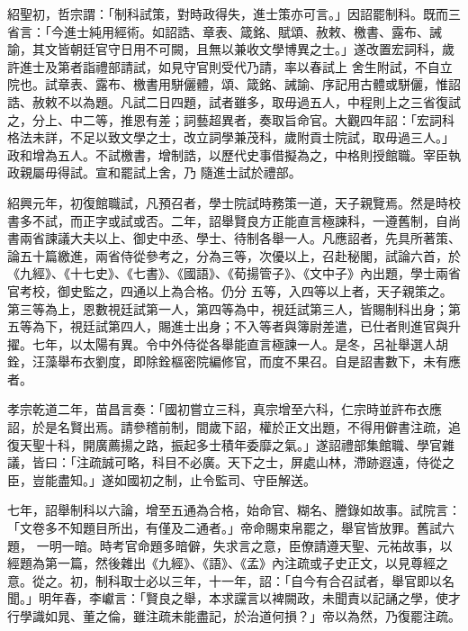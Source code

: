 \begin{pinyinscope}
 紹聖初，哲宗謂：「制科試策，對時政得失，進士策亦可言。」因詔罷制科。既而三省言：「今進士純用經術。如詔誥、章表、箴銘、賦頌、赦敕、檄書、露布、誡諭，其文皆朝廷官守日用不可闕，且無以兼收文學博異之士。」遂改置宏詞科，歲許進士及第者詣禮部請試，如見守官則受代乃請，率以春試上
 舍生附試，不自立院也。試章表、露布、檄書用駢儷體，頌、箴銘、誡諭、序記用古體或駢儷，惟詔誥、赦敕不以為題。凡試二日四題，試者雖多，取毋過五人，中程則上之三省復試之，分上、中二等，推恩有差；詞藝超異者，奏取旨命官。大觀四年詔：「宏詞科格法未詳，不足以致文學之士，改立詞學兼茂科，歲附貢士院試，取毋過三人。」政和增為五人。不試檄書，增制誥，以歷代史事借擬為之，中格則授館職。宰臣執政親屬毋得試。宣和罷試上舍，乃
 隨進士試於禮部。



 紹興元年，初復館職試，凡預召者，學士院試時務策一道，天子親覽焉。然是時校書多不試，而正字或試或否。二年，詔舉賢良方正能直言極諫科，一遵舊制，自尚書兩省諫議大夫以上、御史中丞、學士、待制各舉一人。凡應詔者，先具所著策、論五十篇繳進，兩省侍從參考之，分為三等，次優以上，召赴秘閣，試論六首，於《九經》、《十七史》、《七書》、《國語》、《荀揚管子》、《文中子》內出題，學士兩省官考校，御史監之，四通以上為合格。仍分
 五等，入四等以上者，天子親策之。第三等為上，恩數視廷試第一人，第四等為中，視廷試第三人，皆賜制科出身；第五等為下，視廷試第四人，賜進士出身；不入等者與簿尉差遣，已仕者則進官與升擢。七年，以太陽有異。令中外侍從各舉能直言極諫一人。是冬，呂祉舉選人胡銓，汪藻舉布衣劉度，即除銓樞密院編修官，而度不果召。自是詔書數下，未有應者。



 孝宗乾道二年，苗昌言奏：「國初嘗立三科，真宗增至六科，仁宗時並許布衣應
 詔，於是名賢出焉。請參稽前制，間歲下詔，權於正文出題，不得用僻書注疏，追復天聖十科，開廣薦揚之路，振起多士積年委靡之氣。」遂詔禮部集館職、學官雜議，皆曰：「注疏誠可略，科目不必廣。天下之士，屏處山林，滯跡遐遠，侍從之臣，豈能盡知。」遂如國初之制，止令監司、守臣解送。



 七年，詔舉制科以六論，增至五通為合格，始命官、糊名、謄錄如故事。試院言：「文卷多不知題目所出，有僅及二通者。」帝命賜束帛罷之，舉官皆放罪。舊試六題，
 一明一暗。時考官命題多暗僻，失求言之意，臣僚請遵天聖、元祐故事，以經題為第一篇，然後雜出《九經》、《語》、《孟》內注疏或子史正文，以見尊經之意。從之。初，制科取士必以三年，十一年，詔：「自今有合召試者，舉官即以名聞。」明年春，李巘言：「賢良之舉，本求讜言以裨闕政，未聞責以記誦之學，使才行學識如晁、董之倫，雖注疏未能盡記，於治道何損？」帝以為然，乃復罷注疏。




\end{pinyinscope}
